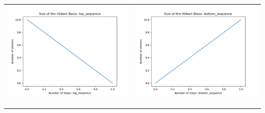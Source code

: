 \documentclass[10pt]{article}
\begin{document}
\begin{tabular}{c|c}
\begin{minipage}{.4\textwidth}
\includegraphics[width=\textwidth]{"DATA/5d/6 generators 1 bound D/top_sequence SIZE"}
\end{minipage} &
\begin{minipage}{.4\textwidth}
\includegraphics[width=\textwidth]{"DATA/5d/6 generators 1 bound D bottomup/bottom_sequence SIZE"}
\end{minipage} \\ \\
\hline \\\begin{minipage}{.4\textwidth}

\end{minipage}
\end{tabular}
\end{document}
